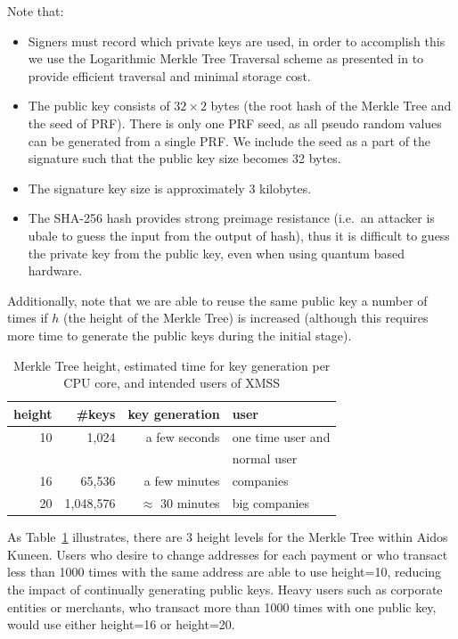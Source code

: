 \documentclass[a4paper,10pt,twocolumn]{article}
\begin{document}
Note that:
\vspace{-0.5\baselineskip}
\begin{itemize}
	\setlength\itemsep{0em}
	\item Signers must record which private keys are used, in order to accomplish this we use the Logarithmic Merkle Tree Traversal 
	scheme as presented in \cite{traverse} to provide efficient traversal and minimal storage cost. \item The public key consists of 
	\(32 \times 2 \) bytes (the root hash of the Merkle Tree and the seed of PRF).	There is only one PRF seed, as all pseudo random 
	values can be generated from a single PRF. We include the seed as a part of the signature such that the public key size becomes 
	32 bytes. \item  The signature key size is approximately 3 kilobytes. \item The SHA-256 hash provides strong preimage resistance 
	(i.e.\ an attacker is ubale to guess the input from the output of hash), thus it is difficult to guess the private key from the 
	public key, even when using quantum based hardware.
\end{itemize}
		
Additionally, note that we are able to reuse the same public key a number of times if \(h\) (the height of the Merkle Tree) is increased (although this requires more time to generate the public keys during the initial stage).

\begin{table}[ht]
	\caption{Merkle Tree height, estimated time for key generation per CPU core, and intended users of XMSS}
    \label{tbl:height}
	\begin{tabular}{rrrl} 
		\toprule
		height  & \#keys & key generation & user \\ 
		\midrule
			  10 & 1,024 &  a few seconds & one time user  and\\
			  & & & normal user \\
			  16 & 65,536 & a few minutes & companies\\
			  20 & 1,048,576 & \( \approx \) 30 minutes &  big companies\\ 
			  \bottomrule
			\end{tabular}
  \end{table}

As Table~\ref{tbl:height} illustrates, there are 3 height levels for the Merkle Tree within Aidos Kuneen. Users who desire to change 
addresses for each payment or who transact less than 1000 times with the same address are able to use height=10, reducing the impact of 
continually generating public keys. Heavy users such as corporate entities or merchants, who transact more than 1000 times with one 
public key, would use either height=16 or height=20.
\end{document}
